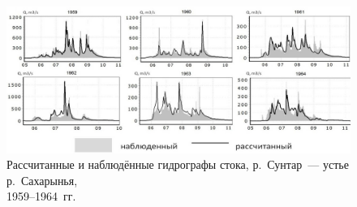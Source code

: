 \begin{figure}[h!]
  \begin{center}
    \includegraphics[width=1\textwidth]{authors/nesterova-1-fig-2.jpg}
  \end{center}
\vspace{-10pt}
  \caption{Рассчитанные и наблюдённые гидрографы стока, р.~Сунтар~--- устье
р.~Сахарынья,\\ 1959--1964~гг.}
  \label{fig:nesterova-1-fig-2}
\vspace{-10pt}
\end{figure}
